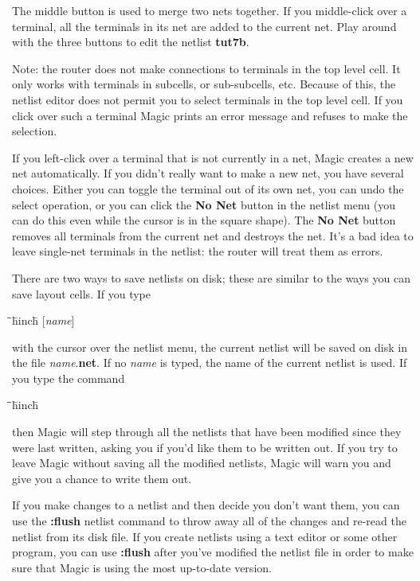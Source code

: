\documentclass[letterpaper,twoside,12pt]{article}
\def\hinch{\hspace*{0.5in}}
\def\starti{\begin{center}\begin{tabbing}\hinch\=\hinch\=\hinch\=hinch\hinch\=\kill}
\def\endi{\end{tabbing}\end{center}}
\def\ii{\>\>\>}
\begin{document}
The middle button is used to merge two nets together.  If you
middle-click over a terminal, all the terminals in its net are
added to the current net.  Play around with the three buttons
to edit the netlist {\bfseries tut7b}.

Note:  the router does not make connections to terminals in the
top level cell.
It only works with terminals in subcells, or sub-subcells, etc.
Because of this, the netlist editor does not permit you to select
terminals in the top level cell.
If you click over such a terminal Magic prints an error message
and refuses to make the selection.

If you left-click over a terminal that is not currently in a net,
Magic creates a new net automatically.  If you didn't
really want to make a new net, you have several choices.  Either
you can toggle the terminal out of its own net, you can undo the
select operation, or you can click the {\bfseries No Net} button in
the netlist menu (you can do this even while the cursor is
in the square shape).  The {\bfseries No Net} button removes all terminals
from the current net and destroys the net.  It's a bad idea to
leave single-net terminals in the netlist:  the router will treat
them as errors.

There are two ways to save netlists on disk;  these are similar
to the ways you can save layout cells.  If you type

\starti
   \ii {\bfseries :savenetlist }[{\itshape name}]
\endi

with the cursor over the netlist menu,
the current netlist will be saved on disk in the file {\itshape name}.{\bfseries net}.
If no {\itshape name} is typed, the name of the current netlist is used.
If you type the command

\starti
   \ii {\bfseries :writeall}
\endi

then Magic will step through all the netlists that have been
modified since they were last written, asking you if
you'd like them to be written out.  If you try to leave Magic
without saving all the modified netlists, Magic will warn you
and give you a chance to write them out.

If you make changes to a netlist and then decide you don't want them,
you can use the {\bfseries :flush} netlist command to throw away
all of the changes and re-read the netlist from its disk file.
If you create netlists using a text editor or some other program,
you can use {\bfseries :flush} after you've modified the netlist file
in order to make sure that Magic is using the most up-to-date
version.
\end{document}
